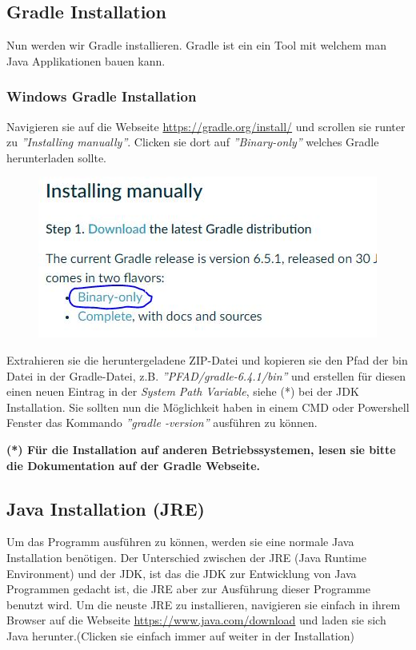 \documentclass[fontsize=12pt,paper=a4,twoside]{scrartcl}
\begin{document}
\subsection{Gradle Installation}
\label{Gradle Installation}

Nun werden wir Gradle installieren. Gradle ist ein ein Tool mit welchem man Java Applikationen bauen kann.

\subsubsection{Windows Gradle Installation}


Navigieren sie auf die Webseite \url{https://gradle.org/install/} und scrollen sie runter zu \textit{''Installing manually''}. Clicken sie dort auf \textit{''Binary-only''} welches Gradle herunterladen sollte.
\begin{figure}[H]
\centering
\includegraphics[width=0.5\linewidth]{GradleDownload.JPG}
\end{figure} 

Extrahieren sie die heruntergeladene ZIP-Datei und kopieren sie den Pfad der bin Datei in der Gradle-Datei, z.B. \textit{''PFAD/gradle-6.4.1/bin''} und erstellen für diesen einen neuen Eintrag in der \textit{System Path Variable}, siehe (*) bei der JDK Installation. Sie sollten nun die Möglichkeit haben in einem CMD oder Powershell Fenster das Kommando \textit{''gradle -version''} ausführen zu können.

\textbf{(*) Für die Installation auf anderen Betriebssystemen, lesen sie bitte die Dokumentation auf der Gradle Webseite.}


\subsection{Java Installation (JRE)}

Um das Programm ausführen zu können, werden sie eine normale Java Installation benötigen. Der Unterschied zwischen der JRE (Java Runtime Environment) und der JDK, ist das die JDK zur Entwicklung von Java Programmen gedacht ist, die JRE aber zur Ausführung dieser Programme benutzt wird. Um die neuste JRE zu installieren, navigieren sie einfach in ihrem Browser auf die Webseite \url{https://www.java.com/download} und laden sie sich Java herunter.(Clicken sie einfach immer auf weiter in der Installation)
\end{document}

